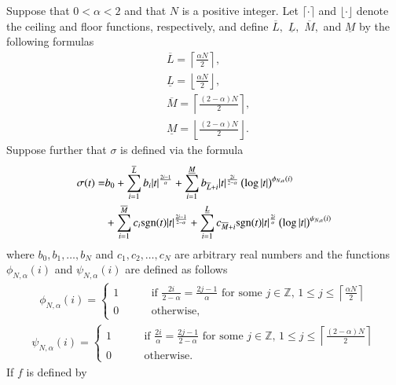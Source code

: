 \begin{theorem}\label{thm_cord}
Suppose that $0<\alpha<2$ and that $N$ is a positive integer. Let 
$\lceil \cdot \rceil$ and $\lfloor \cdot \rfloor$ denote the ceiling and floor functions,
respectively, and define $\overline{L},$ $\underline{L},$ $\overline{M},$ and 
$\underline{M}$ by the following formulas
\begin{align}
&\overline{L} = \left\lceil\frac{\alpha N}{2} \right \rceil, \\
&\underline{L} = \left\lfloor\frac{\alpha N}{2} \right \rfloor,\\
&\overline{M} = \left\lceil\frac{(2-\alpha) N}{2} \right \rceil, \\
&\underline{M} = \left\lfloor\frac{(2-\alpha) N}{2} \right \rfloor.
\end{align}
Suppose further that $\sigma$ is defined via the formula
\begin{align}
\sigma(t) =& b_0+\sum_{i=1}^{\overline{L}} b_i |t|^{\frac{2i-1}{\alpha}}+\sum_{i=1}^{\underline{M}} b_{\overline{L}+i} |t|^\frac{2i}{2-\alpha}\left(\log|t|\right)^{\phi_{N,\alpha}(i)}\nonumber\\
&+\sum_{i=1}^{\overline{M}}c_i {\rm sgn}(t) |t|^\frac{2i-1}{2-\alpha}+\sum_{i=1}^{\underline{L}}c_{\overline{M}+i} {\rm sgn}(t) |t|^\frac{2i}{\alpha}\left(\log|t|\right)^{\psi_{N,\alpha}(i)}\label{eqn_rhfm}
\end{align}
where $b_0,b_1,\dots,b_N$ and $c_1,c_2,\dots,c_N$ are arbitrary real numbers and the functions $\phi_{N,\alpha}(i)$ and $\psi_{N,\alpha}(i)$ are defined as follows
\begin{align}
\phi_{N,\alpha}(i) = \begin{cases}
1 \quad\quad & \,\text{if}\,\, \frac{2i}{2-\alpha} = \frac{2j-1}{\alpha}\,\,\text{for some}\,\, j \in \mathbb{Z},\, 1\le j \le \left\lceil \frac{\alpha N}{2} \right\rceil\\
0 \quad\quad & \,\text{otherwise},
\end{cases}
\end{align}
\begin{align}
\psi_{N,\alpha}(i) = \begin{cases}
1 \quad\quad & \,\text{if}\,\, \frac{2i}{\alpha} = \frac{2j-1}{2-\alpha}\,\,\text{for some}\,\, j \in \mathbb{Z},\, 1\le j \le \left\lceil \frac{(2-\alpha) N}{2} \right\rceil\\
0 \quad\quad & \,\text{otherwise}.
\end{cases}
\end{align}
\noindent If $f$ is defined by

\end{theorem}
